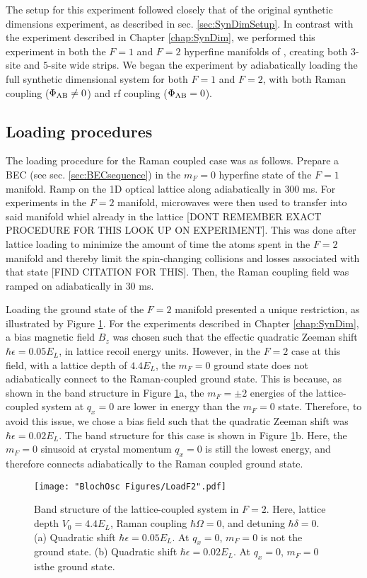 The setup for this experiment followed closely that of the original synthetic dimensions experiment, as described in sec. \ref{sec:SynDimSetup}. In contrast with the experiment described in Chapter \ref{chap:SynDim}, we performed this experiment in both the $F=1$ and $F=2$ hyperfine manifolds of \Rb{}, creating both $3$-site and $5$-site wide strips. We began the experiment by adiabatically loading the full synthetic dimensional system for both $F=1$ and $F=2$, with both Raman coupling ($\Phi_{\rm AB}\neq0$) and rf coupling ($\Phi_{\rm AB}=0$). 

\subsection{Loading procedures}
The loading procedure for the Raman coupled case was  as follows. Prepare a \Rb{} BEC (see sec. \ref{sec:BECsequence}) in the $m_F=0$ hyperfine state of the $F=1$ manifold. Ramp on the 1D optical lattice along \ex{} adiabatically in $300$ ms. For experiments in the $F=2$ manifold, microwaves were then used to transfer into said manifold whiel already in the lattice [DONT REMEMBER EXACT PROCEDURE FOR THIS LOOK UP ON EXPERIMENT]. This was done after lattice loading to minimize the amount of time the atoms spent in the $F=2$ manifold and thereby limit the spin-changing collisions and losses associated with that state [FIND CITATION FOR THIS].   Then, the Raman coupling field was ramped on adiabatically in $30$ ms.

Loading the ground state of the $F=2$ manifold presented a unique restriction, as illustrated by Figure \ref{fig:LoadF2}. For the experiments described in Chapter \ref{chap:SynDim}, a bias magnetic field $B_z$ was chosen such that the effectic quadratic Zeeman shift $\hbar\epsilon = 0.05 E_L$, in lattice recoil energy units. However, in the $F=2$ case at this field, with a lattice depth of $4.4 E_L$, the $m_F=0$ ground state does not adiabatically connect to the Raman-coupled ground state. This is because, as shown in the band structure in Figure \ref{fig:LoadF2}a, the $m_F=\pm2$ energies of the lattice-coupled system at $q_x=0$ are lower in energy than the $m_F=0$ state. Therefore, to avoid this issue, we chose a bias field such that the quadratic Zeeman shift was $\hbar\epsilon = 0.02 E_L$. The band structure for this case is shown in Figure \ref{fig:LoadF2}b. Here, the $m_F=0$ sinusoid at crystal momentum $q_x=0$ is still the lowest energy, and therefore connects adiabatically to the Raman coupled ground state. 
\begin{figure}
\texttt{[image: "BlochOsc Figures/LoadF2".pdf]}
\caption[Band structure of the lattice-coupled system in $F=2$]{Band structure of the lattice-coupled system in $F=2$. Here, lattice depth $V_0=4.4 E_L$, Raman coupling $\hbar\Omega=0$, and detuning $\hbar\delta=0$. (a) Quadratic shift $\hbar\epsilon=0.05 E_L$. At $q_x=0$, $m_F=0$ is not the ground state. (b) Quadratic shift $\hbar\epsilon = 0.02 E_L$.  At $q_x=0$, $m_F=0$ isthe ground state.}
\label{fig:LoadF2}
\end{figure}

